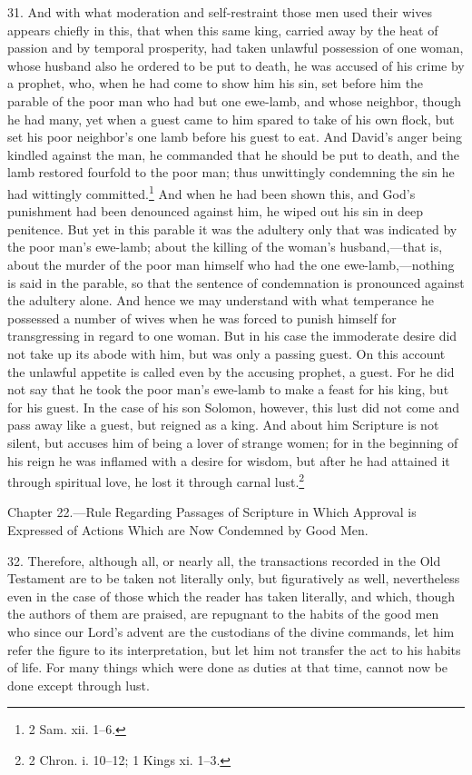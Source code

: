 31. And with what moderation and self-restraint those men used their wives appears chiefly in this, that when this same king, carried away by the heat of passion and by temporal prosperity, had taken unlawful possession of one woman, whose husband also he ordered to be put to death, he was accused of his crime by a prophet, who, when he had come to show him his sin, set before him the parable of the poor man who had but one ewe-lamb, and whose neighbor, though he had many, yet when a guest came to him spared to take of his own flock, but set his poor neighbor’s one lamb before his guest to eat. And David’s anger being kindled against the man, he commanded that he should be put to death, and the lamb restored fourfold to the poor man; thus unwittingly condemning the sin he had wittingly committed.\footnote{2 Sam. xii. 1–6.} And when he had been shown this, and God’s punishment had been denounced against him, he wiped out his sin in deep penitence. But yet in this parable it was the adultery only that was indicated by the poor man’s ewe-lamb; about the killing of the woman’s husband,—that is, about the murder of the poor man himself who had the one ewe-lamb,—nothing is said in the parable, so that the sentence of condemnation is pronounced against the adultery alone. And hence we may understand with what temperance he possessed a number of wives when he was forced to punish himself for transgressing in regard to one woman. But in his case the immoderate desire did not take up its abode with him, but was only a passing guest. On this account the unlawful appetite is called even by the accusing prophet, a guest. For he did not say that he took the poor man’s ewe-lamb to make a feast for his king, but for his guest. In the case of his son Solomon, however, this lust did not come and pass away like a guest, but reigned as a king. And about him Scripture is not silent, but accuses him of being a lover of strange women; for in the beginning of his reign he was inflamed with a desire for wisdom, but after he had attained it through spiritual love, he lost it through carnal lust.\footnote{2 Chron. i. 10–12; 1 Kings xi. 1–3.}


Chapter 22.—Rule Regarding Passages of Scripture in Which Approval is Expressed of Actions Which are Now Condemned by Good Men.

32. Therefore, although all, or nearly all, the transactions recorded in the Old Testament are to be taken not literally only, but figuratively as well, nevertheless even in the case of those which the reader has taken literally, and which, though the authors of them are praised, are repugnant to the habits of the good men who since our Lord’s advent are the custodians of the divine commands, let him refer the figure to its interpretation, but let him not transfer the act to his habits of life. For many things which were done as duties at that time, cannot now be done except through lust.

